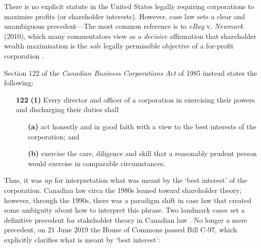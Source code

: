 \documentclass{amsart}
\theoremstyle{indented}
\theoremstyle{indentedProp}
\theoremstyle{indented}
\theoremstyle{indented}
\theoremstyle{indented}
\theoremstyle{indented}
\theoremstyle{indented}
\begin{document}
There is no explicit statute in the United States legally requiring corporations to maximise profits (or shareholder interests). However, case law sets a clear and unambiguous precedent---The most common reference is to {\it eBay} v. {\it Newmark} (2010), which many commentators view as a {\it decisive} affirmation that shareholder wealth maximisation is the {\it sole} legally permissible objective of a for-profit corporation \citep{Boatright-2017}. 

Section 122 of the {\it Canadian Business Corporations Act} of 1985 instead states the following:
\begin{tcolorbox}[left skip=1cm,colback=white]
\footnotesize
\singlespacing
    \begin{enumerate}
        \item[{\bf 122}] {\bf (1)} Every director and officer of a corporation in exercising their powers and discharging their duties shall
        \begin{enumerate}
        \item[]
            \item[{\bf (a)}] act honestly and in good faith with a view to the best interests of the corporation; and
            \item[{\bf (b)}] exercise the care, diligence and skill that a reasonably prudent person would exercise in comparable circumstances.
        \end{enumerate}
    \end{enumerate}
\end{tcolorbox}

Thus, it was up for interpretation what was meant by the `best interest' of the corporation. Canadian law circa the 1980s leaned toward shareholder theory; however, through the 1990s, there was a paradigm shift in case law that created some ambiguity about how to interpret this phrase. Two landmark cases set a definitive precedent for stakeholder theory in Canadian law \citep{Puri-2010, Alexander-2012}. No longer a mere precedent, on 21 June 2019 the House of Commons passed Bill C-97, which explicitly clarifies what is meant by `best interest':
\end{document}
